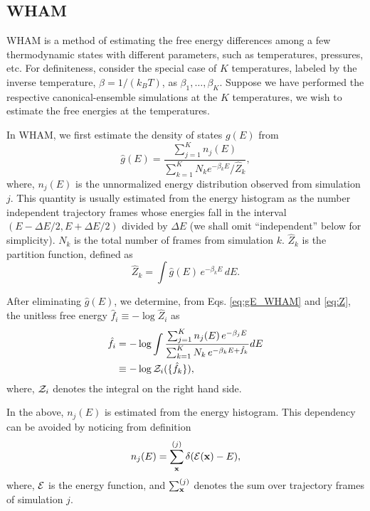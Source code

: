 \documentclass[aip,jcp,preprint,superscriptaddress]{revtex4-1}
\begin{document}
\subsection{WHAM}



WHAM is a method of
estimating the free energy differences
among a few thermodynamic states
with different parameters,
such as temperatures, pressures, etc.
%
For definiteness,
consider the special case of $K$ temperatures,
labeled by the inverse temperature,
$\beta = 1/(k_B T)$,
as
$\beta_1, \ldots, \beta_K$.
%
Suppose we have performed the respective
canonical-ensemble simulations
at the $K$ temperatures,
we wish to estimate the free energies
at the temperatures.



In WHAM,
we first estimate the density of states $g(E)$ from
%
\begin{equation}
\hat g(E)
=
\frac{
  \sum_{j = 1}^K n_j(E)
}
{
  \sum_{k = 1}^K N_k e^{-\beta_k E} / \hat Z_k
},
\label{eq:gE_WHAM}
\end{equation}
%
where,
$n_j(E)$
is the unnormalized energy distribution
observed from simulation $j$.
%
This quantity is usually estimated
from the energy histogram as
the number independent trajectory frames
whose energies fall in the interval
$(E - \Delta E/2, E + \Delta E/2)$
divided by $\Delta E$
(we shall omit ``independent'' below for simplicity).
%
$N_k$
is the total number of frames
from simulation $k$.
%
$\hat Z_k$
is the partition function,
defined as
%
\begin{equation}
\hat Z_k
=
\int \hat g(E) \, e^{-\beta_k E} \, dE.
\label{eq:Z}
\end{equation}




After eliminating $\hat g(E)$,
we determine,
from Eqs. \eqref{eq:gE_WHAM} and \eqref{eq:Z},
the unitless free energy
$\hat f_i \equiv -\log \hat Z_i$
as
\begin{align}
\hat f_i
&=
-\log
  \int
    \frac{
      \sum_{j = 1}^K n_j(E) \, e^{-\beta_j E}
    }
    {
      \sum_{k = 1}^K N_k \, e^{-\beta_k E + \hat f_k}
    }
    dE
\label{eq:f_WHAM}
\\
&\equiv
-\log \mathcal{Z}_i(\{ \hat f_k \}),
\notag
\end{align}
%
where,
$\mathcal{Z}_i$
denotes the integral on the right hand side.



In the above,
$n_j(E)$ is estimated from the energy histogram.
%
This dependency can be avoided
by noticing from definition
%
\begin{equation}
n_j(E)
=
\sum_{\mathbf{x}}^{(j)} \delta(\mathcal{E}(\mathbf{x}) - E),
\label{eq:n_delta}
\end{equation}
%
where,
$\mathcal{E}$
is the energy function,
and
$\sum_{\mathbf{x}}^{(j)}$
denotes the sum over trajectory frames
of simulation $j$.
\end{document}
